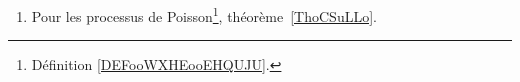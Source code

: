 
\begin{enumerate}
	\item
        Pour les processus de Poisson\footnote{Définition \ref{DEFooWXHEooEHQUJU}.}, théorème~\ref{ThoCSuLLo}.
\end{enumerate}


